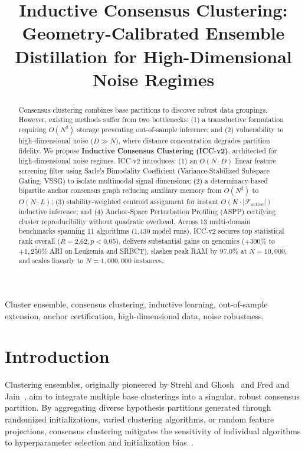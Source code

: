 \documentclass[10pt,conference]{IEEEtran}
\begin{document}
\title{Inductive Consensus Clustering: Geometry-Calibrated Ensemble Distillation for High-Dimensional Noise Regimes}

\author{
}

\maketitle

\begin{abstract}
Consensus clustering combines base partitions to discover robust data groupings. However, existing methods suffer from two bottlenecks: (1) a transductive formulation requiring $O(N^2)$ storage preventing out-of-sample inference, and (2) vulnerability to high-dimensional noise ($D \gg N$), where distance concentration degrades partition fidelity. We propose \textbf{Inductive Consensus Clustering (ICC-v2)}, architected for high-dimensional noise regimes. ICC-v2 introduces: (1) an $O(N \cdot D)$ linear feature screening filter using Sarle's Bimodality Coefficient (Variance-Stabilized Subspace Gating, VSSG) to isolate multimodal signal dimensions; (2) a determinacy-based bipartite anchor consensus graph reducing auxiliary memory from $O(N^2)$ to $O(N \cdot L)$; (3) stability-weighted centroid assignment for instant $O(K \cdot |\mathcal{F}_{\text{active}}|)$ inductive inference; and (4) Anchor-Space Perturbation Profiling (ASPP) certifying cluster reproducibility without quadratic overhead. Across 13 multi-domain benchmarks spanning 11 algorithms (1,430 model runs), ICC-v2 secures top statistical rank overall ($R=2.62, p < 0.05$), delivers substantial gains on genomics ($+300\%$ to $+1{,}250\%$ ARI on Leukemia and SRBCT), slashes peak RAM by $97.0\%$ at $N=10{,}000$, and scales linearly to $N=1{,}000{,}000$ instances.
\end{abstract}

\begin{IEEEkeywords}
Cluster ensemble, consensus clustering, inductive learning, out-of-sample extension, anchor certification, high-dimensional data, noise robustness.
\end{IEEEkeywords}

\section{Introduction}\label{sec:intro}

Clustering ensembles, originally pioneered by Strehl and Ghosh~\cite{strehl2002cluster} and Fred and Jain~\cite{fred2005combining}, aim to integrate multiple base clusterings into a singular, robust consensus partition. By aggregating diverse hypothesis partitions generated through randomized initializations, varied clustering algorithms, or random feature projections, consensus clustering mitigates the sensitivity of individual algorithms to hyperparameter selection and initialization bias~\cite{topchy2005clustering,fern2004solving}.
\end{document}
